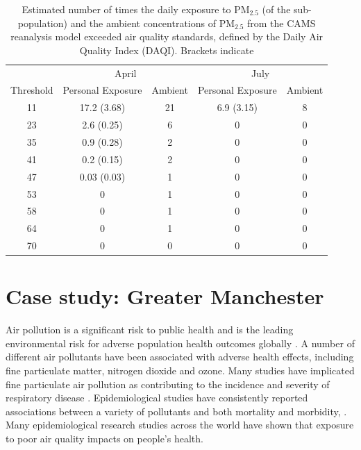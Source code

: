 \documentclass{article}
\begin{document}
\begin{table}[t]
	\centering 
	\caption{Estimated number of times the daily exposure to PM$_{2.5}$ (of the sub-population) and the ambient concentrations of PM$_{2.5}$ from the CAMS reanalysis model exceeded air quality standards, defined by the Daily Air Quality Index (DAQI). Brackets indicate }
	\begin{tabular}{c c c c c}
		\hline \hline 
		          & \multicolumn{2}{c}{April} & \multicolumn{2}{c}{July} \\
		\cmidrule(lr){2-3}
		\cmidrule(lr){4-5}
		Threshold & Personal Exposure & Ambient & Personal Exposure & Ambient \\
		\hline
		11 & 17.2 (3.68) & 21 & 6.9 (3.15) & 8 \\
		23 &  2.6 (0.25) &  6 & 0          & 0 \\
		35 &  0.9 (0.28) &  2 & 0          & 0 \\
		41 &  0.2 (0.15) &  2 & 0          & 0 \\
		47 & 0.03 (0.03) &  1 & 0          & 0 \\
		53 & 0           &  1 & 0          & 0 \\
		58 & 0           &  1 & 0          & 0 \\
		64 & 0           &  1 & 0          & 0 \\
		70 & 0           &  0 & 0          & 0 \\ 
		\hline \hline
	\end{tabular}	
	\label{tab::exceedances}
\end{table}

\clearpage
\section{Case study: Greater Manchester}\label{sec::casestudy2}


\noindent Air pollution is a significant risk to public health and is the leading environmental risk for adverse population health outcomes globally \cite{rep_2017,who_2016,RCP_rep_2016,Par_report}. A number of different air pollutants have been associated with adverse health effects, including fine particulate matter, nitrogen dioxide and ozone. Many studies have implicated fine particulate  air pollution as contributing to the incidence and severity of respiratory disease \citep{pope:95}.  Epidemiological studies have consistently reported associations between a variety of pollutants and both mortality and morbidity, \citep{laden_2000,dominici2000measurement,dominici_2002}. Many epidemiological research studies across the world have shown that exposure to poor air quality impacts on people's health. \\
\end{document}
